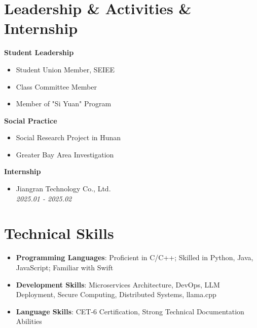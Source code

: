 \documentclass[a4paper]{article}
\begin{document}
\section*{Leadership \& Activities \& Internship}
\hspace{-0.5cm}
\begin{minipage}[t]{0.38\textwidth}
\textbf{Student Leadership}
\begin{itemize}[leftmargin=*,itemsep=0.1em,topsep=0.1em]
\item Student Union Member, SEIEE
\item Class Committee Member
\item Member of "Si Yuan" Program
\end{itemize}
\end{minipage}
\begin{minipage}[t]{0.38\textwidth}
\textbf{Social Practice}
\begin{itemize}[leftmargin=*,itemsep=0.1em,topsep=0.1em]
\item Social Research Project in Hunan
\item Greater Bay Area Investigation
\end{itemize}
\end{minipage}
\begin{minipage}[t]{0.24\textwidth}
\textbf{Internship}
\begin{itemize}[leftmargin=*,itemsep=0.1em,topsep=0.1em]
\item Jiangran Technology Co., Ltd. \\ 
\textit{2025.01 - 2025.02} \\
\end{itemize}
\end{minipage}
\section*{Technical Skills}
\begin{itemize}[leftmargin=*,itemsep=0.2em,topsep=0.2em]
\item \textbf{Programming Languages}: Proficient in C/C++; Skilled in Python, Java, JavaScript; Familiar with Swift
\item \textbf{Development Skills}: Microservices Architecture, DevOps, LLM Deployment, Secure Computing, Distributed Systems, llama.cpp
\item \textbf{Language Skills}: CET-6 Certification, Strong Technical Documentation Abilities
\end{itemize}
\end{document}

